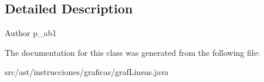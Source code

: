 \subsection{Detailed Description}
\begin{DoxyAuthor}{Author}
p\+\_\+ab1 
\end{DoxyAuthor}


The documentation for this class was generated from the following file\+:\begin{DoxyCompactItemize}
\item 
src/ast/instrucciones/graficas/graf\+Lineas.\+java\end{DoxyCompactItemize}
